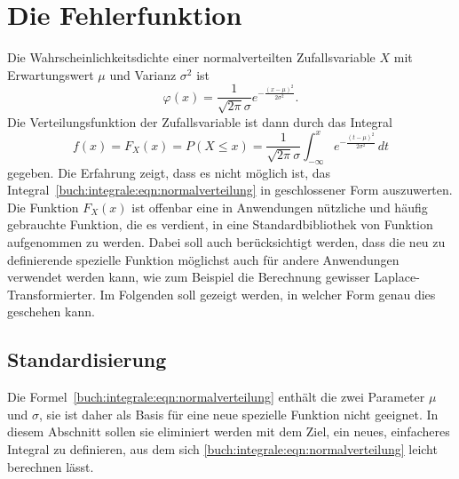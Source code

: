 %
%
%
\section{Die Fehlerfunktion
\label{buch:integrale:section:fehlerfunktion}}
Die Wahrscheinlichkeitsdichte einer normalverteilten Zufallsvariable $X$
mit Erwartungswert $\mu$ und Varianz $\sigma^2$ ist
\begin{equation}
\varphi(x)
=
\frac{1}{\sqrt{2\pi}\sigma}
e^{-\frac{(x-\mu)^2}{2\sigma^2}}.
\label{buch:integrale:eqn:normaldichte}
\end{equation}
Die Verteilungsfunktion der Zufallsvariable ist dann durch das Integral
\begin{equation}
f(x)
=
F_X(x)
=
P(X\le x)
=
\frac{1}{\sqrt{2\pi}\sigma}
\int_{-\infty}^x 
e^{-\frac{(t-\mu)^2}{2\sigma^2}}
\,dt
\label{buch:integrale:eqn:normalverteilung}
\end{equation}
gegeben.
Die Erfahrung zeigt, dass es nicht möglich ist, das
Integral~\eqref{buch:integrale:eqn:normalverteilung}
in geschlossener Form auszuwerten.
Die Funktion $F_X(x)$ ist offenbar eine in Anwendungen nützliche und
häufig gebrauchte Funktion, die es verdient, in eine Standardbibliothek
von Funktion aufgenommen zu werden.
Dabei soll auch berücksichtigt werden, dass die neu zu definierende
spezielle Funktion möglichst auch für andere Anwendungen verwendet
werden kann, wie zum Beispiel die Berechnung gewisser Laplace-Transformierter.
Im Folgenden soll gezeigt werden, in welcher Form genau dies geschehen
kann.

%
%
\subsection{Standardisierung}
Die Formel~\ref{buch:integrale:eqn:normalverteilung} enthält die zwei 
Parameter $\mu$ und $\sigma$, sie ist daher als Basis für eine neue
spezielle Funktion nicht geeignet.
In diesem Abschnitt sollen sie eliminiert werden mit dem Ziel, ein
neues, einfacheres Integral zu definieren, aus dem sich 
\ref{buch:integrale:eqn:normalverteilung} leicht berechnen lässt.

